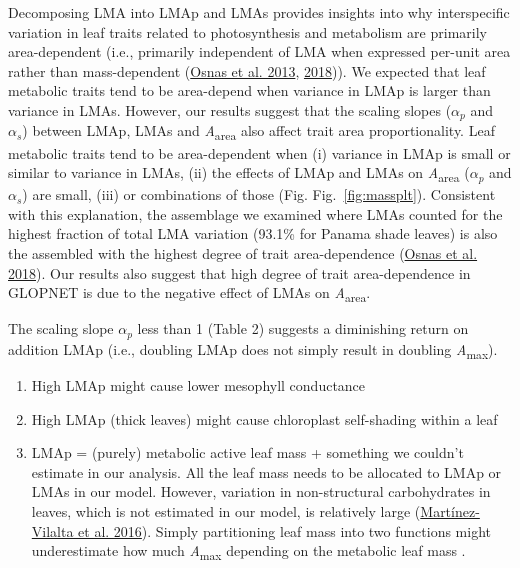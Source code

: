 \documentclass[
  12pt,
  a4paper,
,tablecaptionabove
]{scrartcl}
\providecommand{\tightlist}{%
  \setlength{\itemsep}{0pt}\setlength{\parskip}{0pt}}
\begin{document}
Decomposing LMA into LMAp and LMAs provides insights into why interspecific variation in leaf traits related to photosynthesis and metabolism are primarily area-dependent (i.e., primarily independent of LMA when expressed per-unit area rather than mass-dependent (\protect\hyperlink{ref-Osnas2013}{Osnas et al. 2013}, \protect\hyperlink{ref-Osnas2018}{2018})).
We expected that leaf metabolic traits tend to be area-depend when variance in LMAp is larger than variance in LMAs.
However, our results suggest that the scaling slopes (\(\alpha_p\) and \(\alpha_s\)) between LMAp, LMAs and \emph{A}\textsubscript{area} also affect trait area proportionality.
Leaf metabolic traits tend to be area-dependent when (i) variance in LMAp is small or similar to variance in LMAs, (ii) the effects of LMAp and LMAs on \emph{A}\textsubscript{area} (\(\alpha_p\) and \(\alpha_s\)) are small, (iii) or combinations of those (Fig. Fig.~\ref{fig:massplt}).
Consistent with this explanation, the assemblage we examined where LMAs counted for the highest fraction of total LMA variation (93.1\% for Panama shade leaves) is also the assembled with the highest degree of trait area-dependence (\protect\hyperlink{ref-Osnas2018}{Osnas et al. 2018}).
Our results also suggest that high degree of trait area-dependence in GLOPNET is due to the negative effect of LMAs on \emph{A}\textsubscript{area}.

The scaling slope \(\alpha_p\) less than 1 (Table 2) suggests a diminishing return on addition LMAp (i.e., doubling LMAp does not simply result in doubling \emph{A}\textsubscript{max}).

\begin{enumerate}
\def\labelenumi{\arabic{enumi}.}
\tightlist
\item
  High LMAp might cause lower mesophyll conductance
\item
  High LMAp (thick leaves) might cause chloroplast self-shading within a leaf
\item
  LMAp = (purely) metabolic active leaf mass + something we couldn't estimate in our analysis. All the leaf mass needs to be allocated to LMAp or LMAs in our model. However, variation in non-structural carbohydrates in leaves, which is not estimated in our model, is relatively large (\protect\hyperlink{ref-Martinez-Vilalta2016}{Martínez-Vilalta et al. 2016}). Simply partitioning leaf mass into two functions might underestimate how much \emph{A}\textsubscript{max} depending on the metabolic leaf mass .
\end{enumerate}
\end{document}
